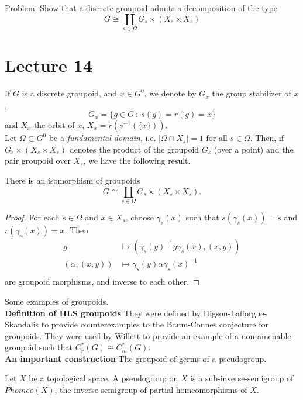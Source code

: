Problem: Show that a discrete groupoid admits a decomposition of the type 
\[G \cong \coprod_{s\in \Omega} G_s \times (X_s \times X_s)\]

\section{Lecture 14}

If $G$ is a discrete groupoid, and $x\in G^0$, we denote by $G_x$ the group stabilizer of $x$, 
\[G_x = \{g\in G \ : \ s(g)=r(g)=x\}\]
and $X_x$ the orbit of $x$, $X_x = r(s^{-1}(\{x\}))$.\\

Let $\Omega \subset G^0$ be a \textit{fundamental domain}, i.e. $|\Omega \cap X_s| = 1$ for all $s\in \Omega$. Then, if $G_s \times (X_s\times X_s)$ denotes the product of the groupoid $G_s$ (over a point) and the pair groupoid over $X_s$, we have the following result.

\begin{prop}
There is an isomorphism of groupoids
\[G \cong \coprod_{s\in \Omega} G_s \times (X_s\times X_s).\]
\end{prop}
\begin{proof}
For each $s\in \Omega$ and $x\in X_s$, choose $\gamma_s(x)$ such that $s(\gamma_s(x))=s$ and $r(\gamma_s(x))=x$. Then 
\[\begin{split}
g & \mapsto (\gamma_s(y)^{-1}g\gamma_s(x), (x,y)) \\
(\alpha, (x,y)) & \mapsto \gamma_s(y)\alpha \gamma_s(x)^{-1} \\
\end{split}\]
are groupoid morphisms, and inverse to each other.
\end{proof}

Some examples of groupoids.\\

\textbf{Definition of HLS groupoids} They were defined by Higson-Lafforgue-Skandalis to provide counterexamples to the Baum-Connes conjecture for groupoids. They were used by Willett to provide an example of a non-amenable groupoid such that $C^*_r(G)\cong C^*_m(G)$. \\

\textbf{An important construction} The groupoid of germs of a pseudogroup.

\begin{definition}
Let $X$ be a topological space. A pseudogroup on $X$ is a sub-inverse-semigroup of $Phomeo(X)$, the inverse semigroup of partial homeomorphisms of $X$.
\end{definition}

